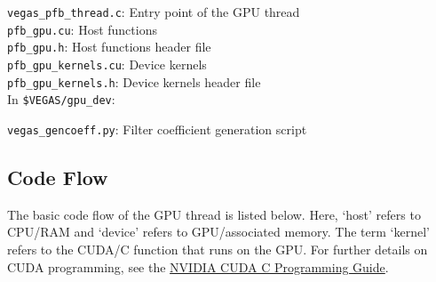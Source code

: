 \documentclass[11pt]{article} %
\begin{document}
\noindent
{\tt vegas\_pfb\_thread.c}: Entry point of the GPU thread\\
{\tt pfb\_gpu.cu}: Host functions\\
{\tt pfb\_gpu.h}: Host functions header file\\
{\tt pfb\_gpu\_kernels.cu}: Device kernels\\
{\tt pfb\_gpu\_kernels.h}: Device kernels header file\\

In {\tt \$VEGAS/gpu\_dev}:

\vspace{11pt}

\noindent
{\tt vegas\_gencoeff.py}: Filter coefficient generation script

\subsection{Code Flow}

The basic code flow of the GPU thread is listed below. Here, `host' refers to
CPU/RAM and `device' refers to GPU/associated memory. The term `kernel' refers
to the CUDA/C function that runs on the GPU. For further details on CUDA
programming, see the \href{http://www.nvidia.com/object/cuda_home_new.html}{NVIDIA CUDA C Programming Guide}. 
\end{document}
